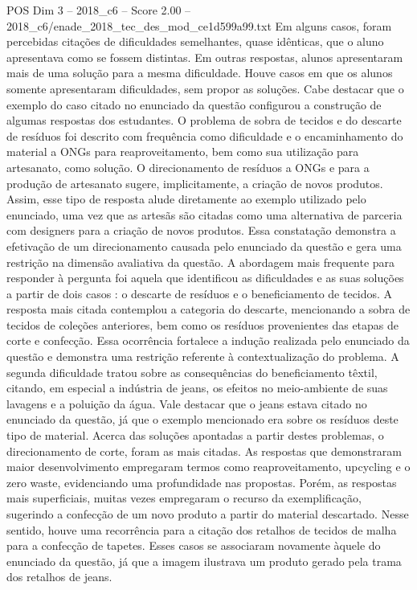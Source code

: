 \begin{textsample}{POS Dim 3 – 2018\_c6 – Score 2.00 – 2018\_c6/enade\_2018\_tec\_des\_mod\_ce1d599a99.txt}
Em alguns casos, foram percebidas citações de dificuldades semelhantes, quase idênticas, que o aluno apresentava como se fossem distintas.
Em outras respostas, alunos apresentaram mais de uma solução para a mesma dificuldade.
Houve casos em que os alunos somente apresentaram dificuldades, sem propor as soluções.
Cabe destacar que o exemplo do caso citado no enunciado da questão configurou a construção de algumas respostas dos estudantes.
O problema de sobra de tecidos e do descarte de resíduos foi descrito com frequência como dificuldade e o encaminhamento do material a ONGs para reaproveitamento, bem como sua utilização para artesanato, como solução.
O direcionamento de resíduos a ONGs e para a produção de artesanato sugere, implicitamente, a criação de novos produtos.
Assim, esse tipo de resposta alude diretamente ao exemplo utilizado pelo enunciado, uma vez que as artesãs são citadas como uma alternativa de parceria com designers para a criação de novos produtos.
Essa constatação demonstra a efetivação de um direcionamento causada pelo enunciado da questão e gera uma restrição na dimensão avaliativa da questão.
A abordagem mais frequente para responder à pergunta foi aquela que identificou as dificuldades e as suas soluções a partir de dois casos : o descarte de resíduos e o beneficiamento de tecidos.
A resposta mais citada contemplou a categoria do descarte, mencionando a sobra de tecidos de coleções anteriores, bem como os resíduos provenientes das etapas de corte e confecção.
Essa ocorrência fortalece a indução realizada pelo enunciado da questão e demonstra uma restrição referente à contextualização do problema.
A segunda dificuldade tratou sobre as consequências do beneficiamento têxtil, citando, em especial a indústria de jeans, os efeitos no meio-ambiente de suas lavagens e a poluição da água.
Vale destacar que o jeans estava citado no enunciado da questão, já que o exemplo mencionado era sobre os resíduos deste tipo de material.
Acerca das soluções apontadas a partir destes problemas, o direcionamento de corte, foram as mais citadas.
As respostas que demonstraram maior desenvolvimento empregaram termos como reaproveitamento, upcycling e o zero waste, evidenciando uma profundidade nas propostas.
Porém, as respostas mais superficiais, muitas vezes empregaram o recurso da exemplificação, sugerindo a confecção de um novo produto a partir do material descartado.
Nesse sentido, houve uma recorrência para a citação dos retalhos de tecidos de malha para a confecção de tapetes.
Esses casos se associaram novamente àquele do enunciado da questão, já que a imagem ilustrava um produto gerado pela trama dos retalhos de jeans.

\end{textsample}
